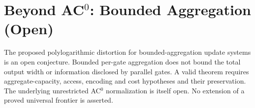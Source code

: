 \section{Beyond AC$^0$: Bounded Aggregation (Open)}
The proposed polylogarithmic distortion for bounded-aggregation
update systems is an open conjecture. Bounded per-gate aggregation
does not bound the total output width or information disclosed by
parallel gates. A valid theorem requires aggregate-capacity,
access, encoding and cost hypotheses and their preservation.
The underlying unrestricted AC$^0$ normalization is itself open.
No extension of a proved universal frontier is asserted.
